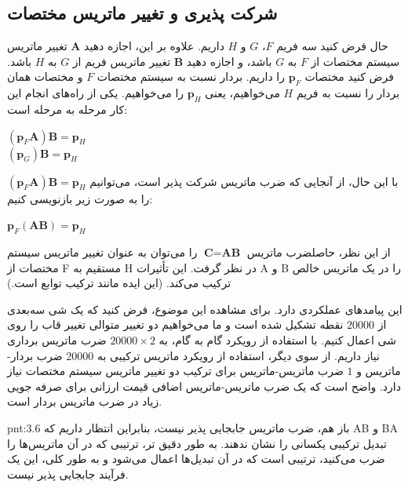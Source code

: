\subsection{\textbf{شرکت پذیری و تغییر ماتریس مختصات}}
\label{subsec:3.4.4}
{
    \Large
    \begin{spacing}{1.5}
        حال فرض کنید سه فریم $F$، $G$ و $H$ داریم. علاوه بر این، اجازه دهید $\textbf{A}$
        تغییر ماتریس سیستم مختصات از $F$ به $G$ باشد،
        و اجازه دهید $\textbf{B}$ تغییر ماتریس فریم از $G$ به $H$ باشد. فرض کنید مختصات $\textbf{p}_{F}$ را داریم.
        بردار نسبت به سیستم مختصات $F$ و مختصات همان بردار را نسبت به فریم $H$ می‌خواهیم، ​​یعنی $\textbf{p}_{H}$ را می‌خواهیم.
        یکی از راه‌های انجام این کار مرحله به مرحله است:

        \begin{center}
            $(\textbf{p}_{F}\textbf{A})\textbf{B}=\textbf{p}_{H}$ \\
            $(\textbf{p}_{G})\textbf{B}=\textbf{p}_{H}$
        \end{center}

        با این حال، از آنجایی که ضرب ماتریس شرکت پذیر است، می‌توانیم $(\textbf{p}_{F}\textbf{A})\textbf{B}=\textbf{p}_{H}$ را به صورت زیر بازنویسی کنیم:

        \begin{center}
            $\textbf{p}_{F}(\textbf{A}\textbf{B})=\textbf{p}_{H}$
        \end{center}

        از این نظر، حاصلضرب ماتریس $\textbf{C}=\textbf{AB}$ را می‌توان به عنوان تغییر ماتریس سیستم مختصات از F مستقیم به H در نظر گرفت.
        این تأثیرات A و B را در یک ماتریس خالص ترکیب می‌کند. (این ایده مانند ترکیب توابع است.)

        این پیامدهای عملکردی دارد. برای مشاهده این موضوع، فرض کنید که یک شی سه‌بعدی از $20000$ نقطه تشکیل شده است و ما می‌خواهیم دو تغییر متوالی تغییر قاب را روی شی اعمال کنیم.
        با استفاده از رویکرد گام به گام، به $20000\times 2$ ضرب ماتریس برداری نیاز داریم. از سوی دیگر، استفاده از رویکرد ماتریس ترکیبی به $20000$ ضرب بردار-ماتریس و $1$ ضرب ماتریس-ماتریس برای ترکیب دو تغییر ماتریس سیستم مختصات نیاز دارد.
        واضح است که یک ضرب ماتریس-ماتریس اضافی قیمت ارزانی برای صرفه جویی زیاد در ضرب ماتریس بردار است.

        \begin{point}{pnt:3.6}
            \Large
            باز هم، ضرب ماتریس جابجایی پذیر نیست، بنابراین انتظار داریم که AB و BA تبدیل ترکیبی یکسانی را نشان ندهند.
            به طور دقیق تر، ترتیبی که در آن ماتریس‌ها را ضرب می‌کنید، ترتیبی است که در آن تبدیل‌ها اعمال می‌شود و به طور کلی، این یک فرآیند جابجایی پذیر نیست.
        \end{point}
    \end{spacing}
}

